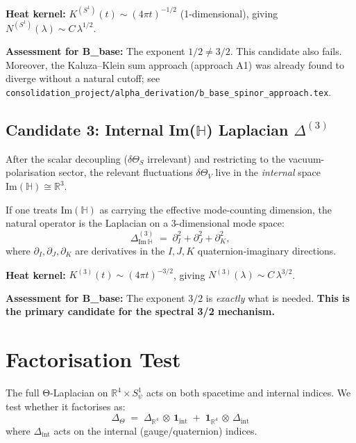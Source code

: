 \documentclass[11pt,a4paper]{article}
\theoremstyle{definition}
\theoremstyle{remark}
\begin{document}
\textbf{Heat kernel:} $K^{(S^1)}(t) \sim (4\pi t)^{-1/2}$ (1-dimensional),
giving $N^{(S^1)}(\lambda) \sim C\,\lambda^{1/2}$.

\textbf{Assessment for B\_base:} The exponent $1/2 \neq 3/2$.
This candidate also fails.
Moreover, the Kaluza–Klein sum approach (approach A1) was already found to
diverge without a natural cutoff; see
\texttt{consolidation\_project/alpha\_derivation/b\_base\_spinor\_approach.tex}.

\subsection{Candidate 3: Internal Im($\mathbb{H}$) Laplacian $\Delta^{(3)}$}
\label{sec:cand3}

After the scalar decoupling ($\delta\Theta_S$ irrelevant) and
restricting to the vacuum-polarisation sector, the relevant fluctuations
$\delta\Theta_V$ live in the \emph{internal} space
$\mathrm{Im}(\mathbb{H}) \cong \mathbb{R}^3$.

If one treats $\mathrm{Im}(\mathbb{H})$ as carrying the effective
mode-counting dimension, the natural operator is the Laplacian on
a 3-dimensional mode space:
\begin{equation}
  \Delta^{(3)}_{\mathrm{Im}\,\mathbb{H}}
  \;=\; \partial_{I}^2 + \partial_{J}^2 + \partial_{K}^2,
  \label{eq:Delta_3}
\end{equation}
where $\partial_I, \partial_J, \partial_K$ are derivatives in the
$I, J, K$ quaternion-imaginary directions.

\textbf{Heat kernel:} $K^{(3)}(t) \sim (4\pi t)^{-3/2}$,
giving $N^{(3)}(\lambda) \sim C\,\lambda^{3/2}$.

\textbf{Assessment for B\_base:} The exponent $3/2$ is \emph{exactly}
what is needed.
\textbf{This is the primary candidate for the spectral 3/2 mechanism.}

\section{Factorisation Test}
\label{sec:factorisation}

The full Θ-Laplacian on $\mathbb{R}^4 \times S^1_\psi$ acts on
both spacetime and internal indices.
We test whether it factorises as:
\begin{equation}
  \Delta_\Theta \;=\; \Delta_{\mathbb{R}^4} \,\otimes\, \mathbf{1}_{\mathrm{int}}
    \;+\; \mathbf{1}_{\mathbb{R}^4} \,\otimes\, \Delta_{\mathrm{int}}
  \label{eq:factorisation}
\end{equation}
where $\Delta_{\mathrm{int}}$ acts on the internal (gauge/quaternion) indices.
\end{document}
